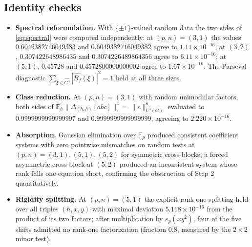 \documentclass[11pt]{article}
\begin{document}
\subsection{Identity checks}
\begin{itemize}
\item \textbf{Spectral reformulation.} With $\{\pm1\}$-valued random data the
two sides of \eqref{eq:spectral} were computed independently: at $(p,n)=(3,1)$
the values $0.6049382716049383$ and $0.6049382716049382$ agree to
$1.11\times10^{-16}$; at $(3,2)$, $0.307422648986435$ and
$0.3074226489864356$ agree to $6.11\times10^{-16}$; at $(5,1)$, $0.45728$ and
$0.4572800000000002$ agree to $1.67\times10^{-16}$. The Parseval diagnostic
$\sum_{\xi\in\widehat{G^4}}|\widehat{B_f}(\xi)|^2=1$ held at all three sizes.
\item \textbf{Class reduction.} At $(p,n)=(3,1)$ with random unimodular
factors, both sides of
$\mathbb{E}_h\|\Delta_{(h,h)}[abc]\|_\square^4=\|c\|_{U^3(G)}^8$ evaluated to
$0.9999999999999997$ and $0.9999999999999999$, agreeing to
$2.220\times10^{-16}$.
\item \textbf{Absorption.} Gaussian elimination over $\mathbb{F}_p$ produced
consistent coefficient systems with zero pointwise mismatches on random tests
at $(p,n)=(3,1),(5,1),(5,2)$ for symmetric cross-blocks; a forced asymmetric
cross-block at $(5,2)$ produced an inconsistent system whose rank falls one
equation short, confirming the obstruction of Step 2 quantitatively.
\item \textbf{Rigidity splitting.} At $(p,n)=(5,1)$ the explicit rank-one
splitting held over all triples $(h,x,y)$ with maximal deviation
$5.118\times10^{-16}$ from the product of its two factors; after multiplication
by $e_p(xy^{2})$, four of the five shifts admitted no rank-one factorization
(fraction $0.8$, measured by the $2\times2$ minor test).
\end{itemize}
\end{document}
